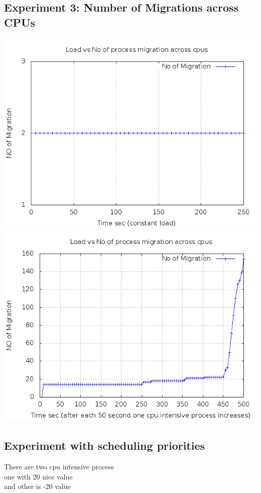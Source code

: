 \documentclass[a4paper,11pt]{report}
\begin{document}
 \subsection{Experiment 3: Number of Migrations across CPUs}
 \includegraphics[scale=0.6]{mig1.png}\\
 \includegraphics[scale=0.6]{mig2.png}
 \subsection{Experiment with scheduling priorities}
 There are two cpu intensive process \\
 one with 20 nice value \\
 and other is -20 value
\end{document}
